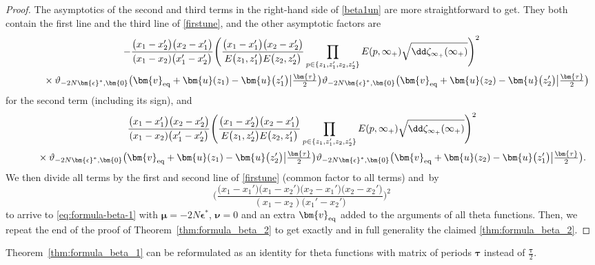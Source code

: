 \documentclass[10pt,a4paper]{amsart}
\numberwithin{equation}{section}
\begin{document}
\begin{proof}
The asymptotics of the second and third terms in the right-hand side of \eqref{beta1un} are more straightforward to get. They both contain the first line and the third line of \eqref{firstune}, and the other asymptotic factors are
\begin{gather*}
 - \frac{\bigl(x_1 - x_2'\bigr)\bigl(x_2 - x_1'\bigr)}{(x_1 - x_2)\bigl(x_1' - x_2'\bigr)}\Biggl(\frac{\bigl(x_1 - x_1'\bigr)\bigl(x_2 - x_2'\bigr)}{E\bigl(z_1,z_1'\bigr)E\bigl(z_2,z_2'\bigr)} \prod_{p \in \{z_1,z_1',z_2,z_2'\}} E(p,\infty_+)\sqrt{\dd \zeta_{\infty_+}(\infty_+)}\Biggr)^2 \\
 \qquad\quad{}\times \vartheta_{-2N\bm{\epsilon}^*,\bm{0}}\bigl(\bm{v}_{{\rm eq}} + \bm{u}(z_1) - \bm{u}\bigl(z_1'\bigr)\big|\tfrac{\bm{\tau}}{2}\bigr) \vartheta_{-2N\bm{\epsilon}^*,\bm{0}}\bigl(\bm{v}_{{\rm eq}} + \bm{u}(z_2) - \bm{u}\bigl(z_2'\bigr)\big|\tfrac{\bm{\tau}}{2}\bigr)
\end{gather*}
for the second term (including its sign), and
\begin{gather*}
 \frac{\bigl(x_1 - x_1'\bigr)\bigl(x_2 - x_2'\bigr)}{(x_1 - x_2)\bigl(x_1' - x_2'\bigr)} \Biggl(\frac{\bigl(x_1 - x_2'\bigr)\bigl(x_2 - x_1'\bigr)}{E\bigl(z_1,z_2'\bigr)E\bigl(z_2,z_1'\bigr)} \prod_{p \in \{z_1,z_1',z_2,z_2'\}} E(p,\infty_+) \sqrt{\dd\zeta_{\infty_+}(\infty_+)} \Biggr)^2 \\
 \qquad{}\times \vartheta_{-2N\bm{\epsilon}^*,\bm{0}}\bigl(\bm{v}_{{\rm eq}} + \bm{u}(z_1) - \bm{u}\bigl(z_2'\bigr)\big|\tfrac{\bm{\tau}}{2}\bigr) \vartheta_{-2N\bm{\epsilon}^*,\bm{0}}\bigl(\bm{v}_{{\rm eq}} + \bm{u}(z_2) - \bm{u}\bigl(z_1'\bigr)\big|\tfrac{\bm{\tau}}{2}\bigr).
\end{gather*}
We then divide all terms by the first and second line of \eqref{firstune} (common
factor to all terms) and~by
\[
\Biggl(\frac{\bigl(x_1 - x_1'\bigr)\bigl(x_1 - x_2'\bigr)\bigl(x_2 - x_1'\bigr)\bigl(x_2 - x_2'\bigr)}{(x_1 - x_2)\bigl(x_1' - x_2'\bigr)}\Biggr)^2
\]
to arrive to \eqref{eq:formula-beta-1} with $\bm{\mu} = -2N \bm{\epsilon}^*$, $\bm{\nu} = 0$ and an extra $\bm{v}_{{\rm eq}}$ added to the arguments of all theta functions. Then, we repeat the end of the proof of Theorem~\ref{thm:formula_beta_2} to get exactly and in full generality the claimed \eqref{thm:formula_beta_2}.
\end{proof}

Theorem~\ref{thm:formula_beta_1} can be reformulated as an identity for theta functions with matrix of periods $\bm{\tau}$ instead of $\frac{\bm{\tau}}{2}$.
\end{document}
